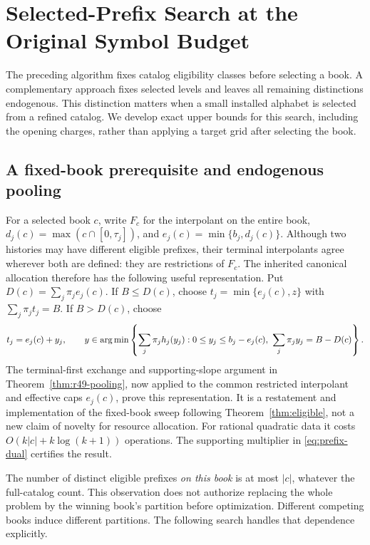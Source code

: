 \section{Selected-Prefix Search at the Original Symbol Budget}\label{sec:r51-search}
The preceding algorithm fixes catalog eligibility classes before selecting a book. A complementary approach fixes selected levels and leaves all remaining distinctions endogenous. This distinction matters when a small installed alphabet is selected from a refined catalog. We develop exact upper bounds for this search, including the opening charges, rather than applying a target grid after selecting the book.

\subsection{A fixed-book prerequisite and endogenous pooling}
For a selected book $c$, write $F_c$ for the interpolant on the entire book, $d_j(c)=\max(c\cap[0,\tau_j])$, and $e_j(c)=\min\{b_j,d_j(c)\}$. Although two histories may have different eligible prefixes, their terminal interpolants agree wherever both are defined: they are restrictions of $F_c$. The inherited canonical allocation therefore has the following useful representation. Put $D(c)=\sum_j\pi_je_j(c)$. If $B\leq D(c)$, choose $t_j=\min\{e_j(c),z\}$ with $\sum_j\pi_jt_j=B$. If $B>D(c)$, choose
\begin{equation}\label{eq:r51-fixed-service}
 t_j=e_j(c)+y_j,\qquad
 y\in\operatorname*{arg\,min}\left\{\sum_j\pi_jh_j(y_j):
 0\leq y_j\leq b_j-e_j(c),\ \sum_j\pi_jy_j=B-D(c)\right\}.
\end{equation}
The terminal-first exchange and supporting-slope argument in Theorem~\ref{thm:r49-pooling}, now applied to the common restricted interpolant and effective caps $e_j(c)$, prove this representation. It is a restatement and implementation of the fixed-book sweep following Theorem~\ref{thm:eligible}, not a new claim of novelty for resource allocation. For rational quadratic data it costs $O(k|c|+k\log(k+1))$ operations. The supporting multiplier in \eqref{eq:prefix-dual} certifies the result.

The number of distinct eligible prefixes \emph{on this book} is at most $|c|$, whatever the full-catalog count. This observation does not authorize replacing the whole problem by the winning book's partition before optimization. Different competing books induce different partitions. The following search handles that dependence explicitly.

